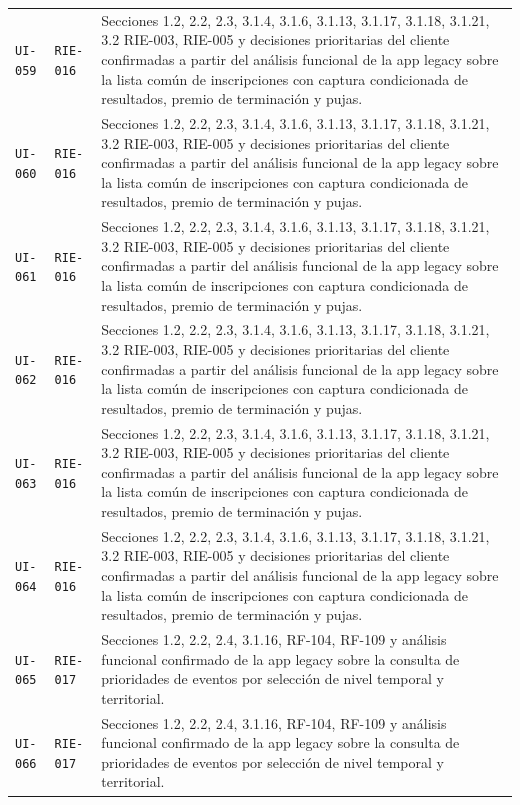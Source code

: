 \documentclass[10pt,letterpaper]{article}
\begin{document}
\begin{landscape}
\begin{longtable}{P{2.7cm}P{2.6cm}P{15.7cm}}
\texttt{UI-059} & \texttt{RIE-016} & Secciones 1.2, 2.2, 2.3, 3.1.4, 3.1.6, 3.1.13, 3.1.17, 3.1.18, 3.1.21, 3.2 RIE-003, RIE-005 y decisiones prioritarias del cliente confirmadas a partir del análisis funcional de la app legacy sobre la lista común de inscripciones con captura condicionada de resultados, premio de terminación y pujas.\\
\texttt{UI-060} & \texttt{RIE-016} & Secciones 1.2, 2.2, 2.3, 3.1.4, 3.1.6, 3.1.13, 3.1.17, 3.1.18, 3.1.21, 3.2 RIE-003, RIE-005 y decisiones prioritarias del cliente confirmadas a partir del análisis funcional de la app legacy sobre la lista común de inscripciones con captura condicionada de resultados, premio de terminación y pujas.\\
\texttt{UI-061} & \texttt{RIE-016} & Secciones 1.2, 2.2, 2.3, 3.1.4, 3.1.6, 3.1.13, 3.1.17, 3.1.18, 3.1.21, 3.2 RIE-003, RIE-005 y decisiones prioritarias del cliente confirmadas a partir del análisis funcional de la app legacy sobre la lista común de inscripciones con captura condicionada de resultados, premio de terminación y pujas.\\
\texttt{UI-062} & \texttt{RIE-016} & Secciones 1.2, 2.2, 2.3, 3.1.4, 3.1.6, 3.1.13, 3.1.17, 3.1.18, 3.1.21, 3.2 RIE-003, RIE-005 y decisiones prioritarias del cliente confirmadas a partir del análisis funcional de la app legacy sobre la lista común de inscripciones con captura condicionada de resultados, premio de terminación y pujas.\\
\texttt{UI-063} & \texttt{RIE-016} & Secciones 1.2, 2.2, 2.3, 3.1.4, 3.1.6, 3.1.13, 3.1.17, 3.1.18, 3.1.21, 3.2 RIE-003, RIE-005 y decisiones prioritarias del cliente confirmadas a partir del análisis funcional de la app legacy sobre la lista común de inscripciones con captura condicionada de resultados, premio de terminación y pujas.\\
\texttt{UI-064} & \texttt{RIE-016} & Secciones 1.2, 2.2, 2.3, 3.1.4, 3.1.6, 3.1.13, 3.1.17, 3.1.18, 3.1.21, 3.2 RIE-003, RIE-005 y decisiones prioritarias del cliente confirmadas a partir del análisis funcional de la app legacy sobre la lista común de inscripciones con captura condicionada de resultados, premio de terminación y pujas.\\
\texttt{UI-065} & \texttt{RIE-017} & Secciones 1.2, 2.2, 2.4, 3.1.16, RF-104, RF-109 y análisis funcional confirmado de la app legacy sobre la consulta de prioridades de eventos por selección de nivel temporal y territorial.\\
\texttt{UI-066} & \texttt{RIE-017} & Secciones 1.2, 2.2, 2.4, 3.1.16, RF-104, RF-109 y análisis funcional confirmado de la app legacy sobre la consulta de prioridades de eventos por selección de nivel temporal y territorial.\\

\end{longtable}
\end{landscape}
\end{document}

